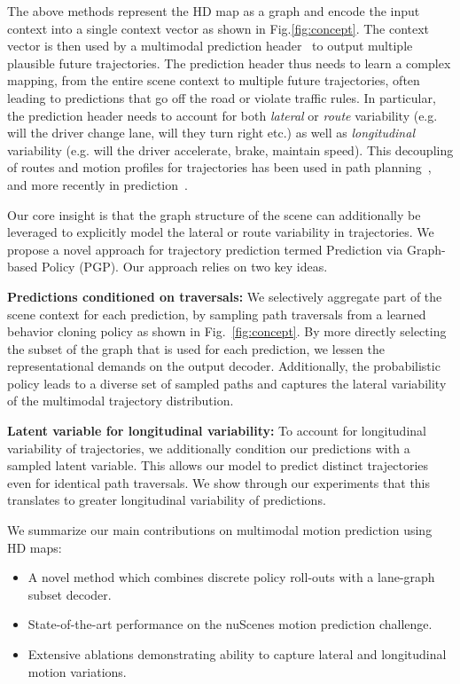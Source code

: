 \documentclass{article}
\begin{document}
The above methods represent the HD map as a graph and encode the input context into a single context vector as shown in Fig.\ref{fig:concept}.
The context vector is then used by a multimodal prediction header~\citep{cui2019multimodal,chai2019multipath} to output multiple plausible future trajectories. The prediction header thus needs to learn a complex mapping, from the entire scene context to multiple future trajectories, often leading to predictions that go off the road or violate traffic rules. In particular, the prediction header needs to account for both \textit{lateral} or \textit{route} variability (e.g. will the driver change lane, will they turn right etc.) as well as \textit{longitudinal} variability (e.g. will the driver accelerate, brake, maintain speed). This decoupling of routes and motion profiles for trajectories has been used in path planning~\citep{paden2016survey, lavalle2006planning}, and more recently in prediction~\citep{zhang2020map}. 


Our core insight is that the graph structure of the scene can additionally be leveraged to explicitly model the lateral or route variability in trajectories. We propose a novel approach for trajectory prediction termed Prediction via Graph-based Policy (PGP). Our approach relies on two key ideas.



 \textbf{Predictions conditioned on traversals:} We selectively aggregate part of the scene context for each prediction, by sampling path traversals from a learned behavior cloning policy as shown in Fig.~\ref{fig:concept}. By more directly selecting the subset of the graph that is used for each prediction, we lessen the representational demands on the output decoder. Additionally, the probabilistic policy leads to a diverse set of sampled paths and captures the lateral variability of the multimodal trajectory distribution.

\textbf{Latent variable for longitudinal variability:} To account for longitudinal variability of trajectories, we additionally condition our predictions with a sampled latent variable. This allows our model to predict distinct trajectories even for identical path traversals. We show through our experiments that this translates to greater longitudinal variability of predictions.  





We summarize our main contributions on multimodal motion prediction using HD maps:
\begin{itemize}[noitemsep,topsep=0pt,leftmargin=10pt]
    \item A novel method which combines discrete policy roll-outs with a lane-graph subset decoder.
    \item State-of-the-art performance on the nuScenes motion prediction challenge.
    \item Extensive ablations demonstrating ability to capture lateral and longitudinal motion variations.
\end{itemize}
\end{document}
